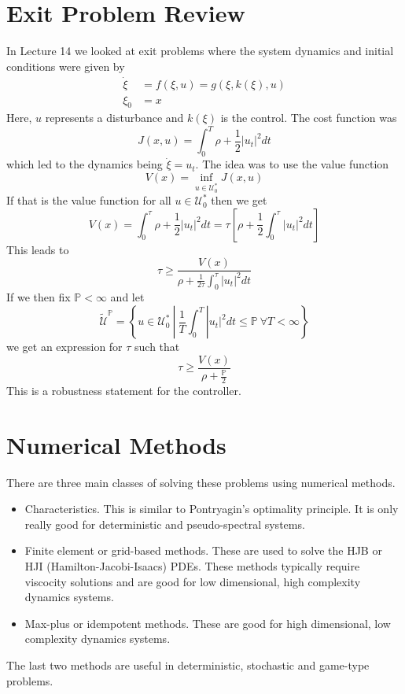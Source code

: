 \mainmatter%
\setcounter{page}{1}

\lectureseries[\course]{\course}

\date{November 19, 2009}

\setaddress%

\setcounter{lecture}{14}
\setcounter{chapter}{14}


\section{Exit Problem Review}
In Lecture 14 we looked at exit problems where the system dynamics and initial conditions were given by
\begin{align*}
\dot{\xi} &= f(\xi,u) = g(\xi,k(\xi),u) \\
\xi_0 &= x
\end{align*}
Here, $u$ represents a disturbance and $k(\xi)$ is the control.
The cost function was
$$J(x,u) = \int_0^T\rho+\frac{1}{2}|u_t|^2dt$$
which led to the dynamics being $\dot{\xi}=u_t$.
The idea was to use the value function
$$V(x) = \inf_{u\in\mathcal{U}_0^\ast}J(x,u)$$
If that is the value function for all $u\in\mathcal{U}_0^\ast$ then we get
$$V(x) = \int_0^\tau \rho + \frac{1}{2}|u_t|^2dt = \tau\left[\rho+\frac{1}{2}\int_0^\tau|u_t|^2dt\right]$$
This leads to
$$\tau\geq\frac{V(x)}{\rho+\frac{1}{2\tau}\int_0^\tau|u_t|^2dt}$$
If we then fix $\mathbb{P}<\infty$ and let
$$\tilde{\mathcal{U}}^\mathbb{P} = \left\lbrace u\in\mathcal{U}_0^\ast~|~\frac{1}{T}\int_0^T|u_t|^2dt \leq \mathbb{P}~\forall T<\infty \right\rbrace$$
we get an expression for $\tau$ such that
$$\tau\geq \frac{V(x)}{\rho+\frac{\mathbb{P}}{2}}$$
This is a robustness statement for the controller.

\section{Numerical Methods}
There are three main classes of solving these problems using numerical methods.
\begin{itemize}
\item Characteristics.
This is similar to Pontryagin's optimality principle.
It is only really good for deterministic and pseudo-spectral systems.
\item Finite element or grid-based methods.
These are used to solve the HJB or HJI (Hamilton-Jacobi-Isaacs) PDEs.
These methods typically require viscocity solutions and are good for low dimensional, high complexity dynamics systems.
\item Max-plus or idempotent methods.
These are good for high dimensional, low complexity dynamics systems.
\end{itemize}
The last two methods are useful in deterministic, stochastic and game-type problems.

